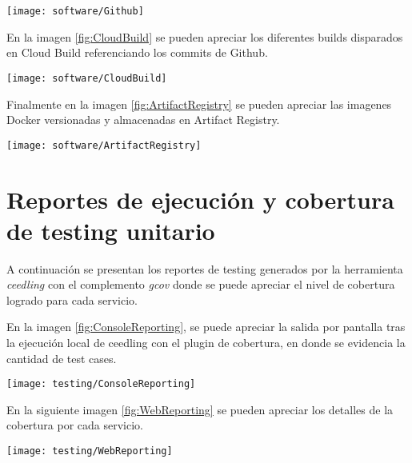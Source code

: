 \begin{center}
   \texttt{[image: software/Github]}
   \label{fig:Github}
\end{center}


En la imagen \ref{fig:CloudBuild} se pueden apreciar los diferentes builds disparados en Cloud Build referenciando los commits de Github.

\begin{center}
   \texttt{[image: software/CloudBuild]}
   \label{fig:CloudBuild}
\end{center}

Finalmente en la imagen \ref{fig:ArtifactRegistry} se pueden apreciar las imagenes Docker versionadas y almacenadas en Artifact Registry.

\begin{center}
   \texttt{[image: software/ArtifactRegistry]}
   \label{fig:ArtifactRegistry}
\end{center}






\section{Reportes de ejecución y cobertura de testing unitario}

A continuación se presentan los reportes de testing generados por la herramienta \textit{ceedling} con el complemento \textit{gcov} donde se puede apreciar el nivel de cobertura logrado para cada servicio.

En la imagen \ref{fig:ConsoleReporting}, se puede apreciar la salida por pantalla tras la ejecución local de ceedling con el plugin de cobertura, en donde se evidencia la cantidad de test cases. 

\begin{center}
   \texttt{[image: testing/ConsoleReporting]}
   \label{fig:ConsoleReporting}
\end{center}

En la siguiente imagen \ref{fig:WebReporting} se pueden apreciar los detalles de la cobertura por cada servicio.

\begin{center}
   \texttt{[image: testing/WebReporting]}
   \label{fig:WebReporting}
\end{center}







